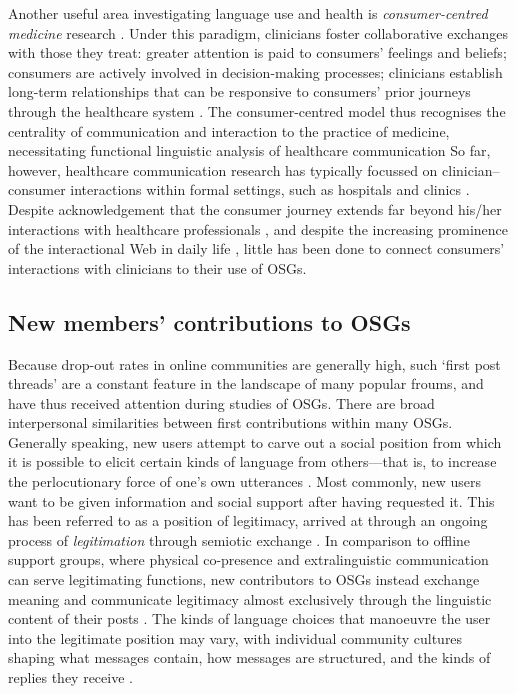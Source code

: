 \documentclass{article}
\renewcommand{\cite}{\parencite}
\begin{document}
Another useful area investigating language use and health is \emph{consumer-centred medicine} research \cite{stewart_effective_1995}. Under this paradigm, clinicians foster collaborative exchanges with those they treat: greater attention is paid to consumers' feelings and beliefs; consumers are actively involved in decision-making processes; clinicians establish long-term relationships that can be responsive to consumers' prior journeys through the healthcare system \cite{woodward-kron_international_2016}. The consumer-centred model thus recognises the centrality of communication and interaction to the practice of medicine, necessitating functional linguistic analysis of healthcare communication%
So far, however, healthcare communication research has typically focussed on clinician--consumer interactions within formal settings, such as hospitals and clinics \cite{slade_communicating_2015}. Despite acknowledgement that the consumer journey extends far beyond his\slash her interactions with healthcare professionals \cite{balka_situating_2010,dickerson_cancer_2011}, and despite the increasing prominence of the interactional Web in daily life \cite{hadlington_cognitive_2015}, little has been done to connect consumers' interactions with clinicians to their use of OSGs.



\subsection{New members' contributions to OSGs}


Because drop-out rates in online communities are generally high, such `first post threads' are a constant feature in the landscape of many popular froums, and have thus received attention during studies of OSGs. There are broad interpersonal similarities between first contributions within many OSGs. Generally speaking, new users attempt to carve out a social position from which it is possible to elicit certain kinds of language from others---that is, to increase the perlocutionary force of one's own utterances \cite{austin_how_1975,roberts_communicative_1996}. Most commonly, new users want to be given information and social support after having requested it. This has been referred to as a position of legitimacy, arrived at through an ongoing process of \emph{legitimation} through semiotic exchange \cite{davies_communities_2005,smithson_developing_2012,van_leeuwen_legitimation_2007}. In comparison to offline support groups, where physical co-presence and extralinguistic communication can serve legitimating functions, new contributors to OSGs instead exchange meaning and communicate legitimacy almost exclusively through the linguistic content of their posts \cite{galegher_legitimacy_1998}. The kinds of language choices that manoeuvre the user into the legitimate position may vary, with individual community cultures shaping what messages contain, how messages are structured, and the kinds of replies they receive \cite{gallagher_what_2015}.
\end{document}

